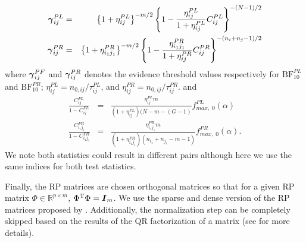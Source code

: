 \documentclass[times,sort&compress,3p]{elsarticle}
\theoremstyle{plain}%
\theoremstyle{definition}
\def\be{\begin{eqnarray}}
\def\ee{\end{eqnarray}}
\def\trans{^{\rm T}}
\newcommand{\uF}       {\mbox{\boldmath$F$}}
\newcommand{\uI}       {\mbox{\boldmath$I$}}
\newcommand{\ugamma}            {\mbox{\boldmath$\gamma$}}
\begin{document}
\be
\ugamma^{PL}_{ij} &=& \left\{ 1 + \eta^{PL}_{ij}\right\}^{-m/2}\left\{ 1 - \frac{\eta^{PL}_{ij}}{1 + \eta^{PL}_{ij}} C^{PL}_{ij} \right\}^{-(N -1)/2} \nonumber \\
\ugamma^{PR}_{ij} &=& \left\{ 1 + \eta^{PR}_{i_1j_1}\right\}^{-m/2}\left\{ 1 - \frac{\eta^{PR}_{i_1j_1}}{1 + \eta^{PR}_{ij}} C^{PR}_{ij} \right\}^{-(n_i+n_j -1)/2} \nonumber
\ee
where $\ugamma^{PF}_{ij}$ and $\ugamma^{PR}_{ij}$ denotes the evidence threshold values respectively for $\text{BF}_{10}^{PL}$ and $\text{BF}^{PR}_{10}$; $\eta^{PL}_{ij} = n_{0,ij}/ \tau^{PL}_{ij}$, and $\eta^{PR}_{ij} = n_{0,ij}/ \tau^{PR}_{ij}$.
and 
\be
\frac{C^{PL}_{ij}}{1 -C^{PL}_{ij}} &=& \frac{ \eta^{PL}_{ij} m}{(1+ \eta^{PL}_{ij})(N - m -(G-1)}f^{PL}_{max,\;0}(\alpha) \nonumber \\
\frac{C^{PR}_{i_1 j_1}}{1 - C^{PR}_{i_1j_1}} &=& \frac{ \eta^{PR}_{i_1 j_1} m}{(1+ \eta^{PR}_{i_1 j_1})(n_{i_1} +n_{j_1} - m -1)}f^{PR}_{max,\;0}(\alpha). \nonumber 
\ee
We note both statistics could result in different pairs although here we use the same indices for both test statistics. 

Finally, the RP matrices are chosen orthogonal matrices so that for a given RP matrix $\Phi \in \mathbb{R}^{p \times m}$,  $\Phi\trans\Phi = \uI_{m}$. We use the sparse and dense version of the RP matrices proposed by \cite{srivastava2014raptt}. Additionally, the normalization step can be completely skipped based on the results of the QR factorization of a matrix (see \citealp{zoh2018powerful} for more details).
\end{document}

